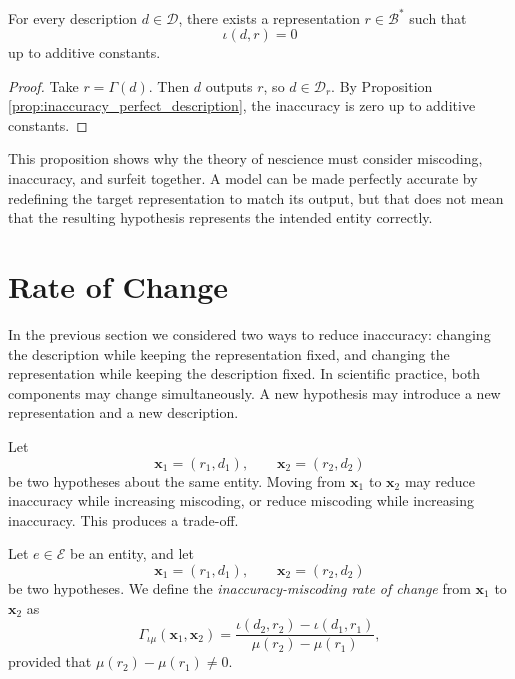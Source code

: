 \begin{proposition}
\label{prop:trivial_inaccuracy_reduction}
For every description \(d\in\mathcal D\), there exists a representation \(r\in\mathcal B^\ast\) such that
\[
\iota(d,r)=0
\]
up to additive constants.
\end{proposition}

\begin{proof}
Take \(r=\Gamma(d)\). Then \(d\) outputs \(r\), so \(d\in\mathcal D_r\). By Proposition \ref{prop:inaccuracy_perfect_description}, the inaccuracy is zero up to additive constants.
\end{proof}

This proposition shows why the theory of nescience must consider miscoding, inaccuracy, and surfeit together. A model can be made perfectly accurate by redefining the target representation to match its output, but that does not mean that the resulting hypothesis represents the intended entity correctly.

%
%

\section{Rate of Change}
\label{sec:Inaccuracy_Miscoding_Rate_of_Change}

In the previous section we considered two ways to reduce inaccuracy: changing the description while keeping the representation fixed, and changing the representation while keeping the description fixed. In scientific practice, both components may change simultaneously. A new hypothesis may introduce a new representation and a new description.

Let
\[
\mathbf{x}_1=(r_1,d_1),
\qquad
\mathbf{x}_2=(r_2,d_2)
\]
be two hypotheses about the same entity. Moving from \(\mathbf{x}_1\) to \(\mathbf{x}_2\) may reduce inaccuracy while increasing miscoding, or reduce miscoding while increasing inaccuracy. This produces a trade-off.

\begin{definition}
Let \(e \in \mathcal E\) be an entity, and let
\[
\mathbf{x}_1=(r_1,d_1), \qquad \mathbf{x}_2=(r_2,d_2)
\]
be two hypotheses. We define the \emph{inaccuracy-miscoding rate of change} from \(\mathbf{x}_1\) to \(\mathbf{x}_2\) as
\[
\Gamma_{\iota\mu}(\mathbf{x}_1,\mathbf{x}_2)
=
\frac{
\iota(d_2,r_2)-\iota(d_1,r_1)
}{
\mu(r_2)-\mu(r_1)
},
\]
provided that \(\mu(r_2)-\mu(r_1)\neq 0\).
\end{definition}

